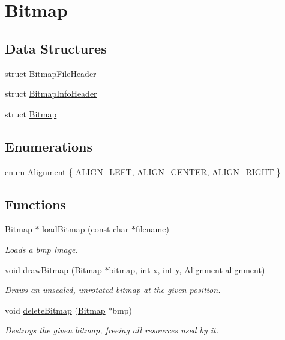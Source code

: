 \hypertarget{group___bitmap}{}\section{Bitmap}
\label{group___bitmap}
\subsection*{Data Structures}
\begin{DoxyCompactItemize}
\item 
struct \hyperlink{struct_bitmap_file_header}{Bitmap\+File\+Header}
\item 
struct \hyperlink{struct_bitmap_info_header}{Bitmap\+Info\+Header}
\item 
struct \hyperlink{struct_bitmap}{Bitmap}
\end{DoxyCompactItemize}
\subsection*{Enumerations}
\begin{DoxyCompactItemize}
\item 
enum \hyperlink{group___bitmap_gacdfaca60ec19c0265bac2692d7982726}{Alignment} \{ \hyperlink{group___bitmap_ggacdfaca60ec19c0265bac2692d7982726a6ec599857e15466988726932dd592305}{A\+L\+I\+G\+N\+\_\+\+L\+E\+FT}, 
\hyperlink{group___bitmap_ggacdfaca60ec19c0265bac2692d7982726a5624165187e56db612253e608a45b1c6}{A\+L\+I\+G\+N\+\_\+\+C\+E\+N\+T\+ER}, 
\hyperlink{group___bitmap_ggacdfaca60ec19c0265bac2692d7982726a9c81840e8cad46418b39a8b74a246354}{A\+L\+I\+G\+N\+\_\+\+R\+I\+G\+HT}
 \}
\end{DoxyCompactItemize}
\subsection*{Functions}
\begin{DoxyCompactItemize}
\item 
\hyperlink{struct_bitmap}{Bitmap} $\ast$ \hyperlink{group___bitmap_ga3506880ffd407c36eb8aaddd2c1606d2}{load\+Bitmap} (const char $\ast$filename)
\begin{DoxyCompactList}\small\item\em Loads a bmp image. \end{DoxyCompactList}\item 
void \hyperlink{group___bitmap_ga18d05a1c671f4638bc63d37874efb9d4}{draw\+Bitmap} (\hyperlink{struct_bitmap}{Bitmap} $\ast$bitmap, int x, int y, \hyperlink{group___bitmap_gacdfaca60ec19c0265bac2692d7982726}{Alignment} alignment)
\begin{DoxyCompactList}\small\item\em Draws an unscaled, unrotated bitmap at the given position. \end{DoxyCompactList}\item 
void \hyperlink{group___bitmap_ga08c1d4f4fff81df260d979ea8fc1aa61}{delete\+Bitmap} (\hyperlink{struct_bitmap}{Bitmap} $\ast$bmp)
\begin{DoxyCompactList}\small\item\em Destroys the given bitmap, freeing all resources used by it. \end{DoxyCompactList}\end{DoxyCompactItemize}

